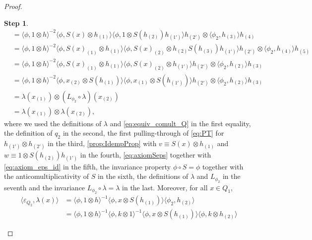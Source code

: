 \documentclass[a4paper,10pt]{amsart}
\newcommand{\eval}[2]{\langle #1 , #2\rangle}
\theoremstyle{definition}
\newtheorem{step-goursat}{Step}
\begin{document}
\begin{proof}
\begin{step-goursat}
\begin{align*}
        &=
            \eval{\phi}{1\otimes h}^{-2}
                \eval{\phi}{S(x) \otimes h_{(1)}}
                        \eval{\phi}{1\otimes S(h_{(2)})h_{(1')}}
                            h_{(2')} \otimes \eval{\phi_2}{h_{(3)}} h_{(4)}
        \\
        &=
            \eval{\phi}{1\otimes h}^{-2}
                \eval{\phi}{S(x)_{(1)} \otimes h_{(1)}}
                    \eval{\phi}{S(x)_{(2)}\otimes h_{(2)}S(h_{(3)})h_{(1')}}
                            h_{(2')} \otimes \eval{\phi_2}{h_{(4)}}h_{(5)}
        \\
        &=
            \eval{\phi}{1\otimes h}^{-2}
                \eval{\phi}{S(x)_{(1)} \otimes h_{(1)}}
                    \eval{\phi}{S(x)_{(2)}\otimes h_{(1')}}
                            h_{(2')} \otimes \eval{\phi_2}{h_{(2)}} h_{(3)}
        \\
        &=
            \eval{\phi}{1\otimes h}^{-2}
                \eval{\phi}{x_{(2)} \otimes S(h_{(1)})}
                    \eval{\phi}{x_{(1)}\otimes S(h_{(1')})}
                            h_{(2')} \otimes \eval{\phi_2}{h_{(2)}} h_{(3)}
        \\
        &=
        \lambda(x_{(1)}) \otimes (L_{\phi_2} \circ \lambda)(x_{(2)})
        \\
        &=
        \lambda(x_{(1)}) \otimes \lambda(x_{(2)}),
    \end{align*}
    where we used the definitions of $\lambda$ and \cref{eq:equiv_comult_Q} in the first equality, the definition of $q_2$ in the second, the first pulling-through of \cref{eq:PT} for $h_{(1')} \otimes h_{(2')}$ in the third, \cref{prop:IdempProp} with $v\equiv S(x)\otimes h_{(1)}$ and $w\equiv 1 \otimes S(h_{(2)})h_{(1')}$ in the fourth, \cref{eq:axiomSeps} together with \cref{eq:axiom_eps_id} in the fifth, the invariance property $\phi \circ S=\phi$ together with the anticomultiplicativity of $S$ in the sixth, the definitions of $\lambda$ and $L_{\phi_2}$ in the seventh and the invariance $L_{\phi_2} \circ \lambda= \lambda$ in the last.
    \smallbreak\noindent%
    Moreover, for all $x\in Q_1$,
    \begin{align*}
        \eval{\varepsilon_{Q_2}}{\lambda(x)}
        &=
        \eval{\phi}{1\otimes h}^{-1}
            \eval{\phi}{x \otimes S(h_{(1)})}
                \eval{\phi_2}{h_{(2)}}
        \\
        &=
        \eval{\phi}{1\otimes h}^{-1}
            \eval{\phi}{k\otimes 1}^{-1}
                \eval{\phi}{x \otimes S(h_{(1)})}
                    \eval{\phi}{k\otimes h_{(2)}}

\end{align*}
\end{step-goursat}
\end{proof}
\end{document}
